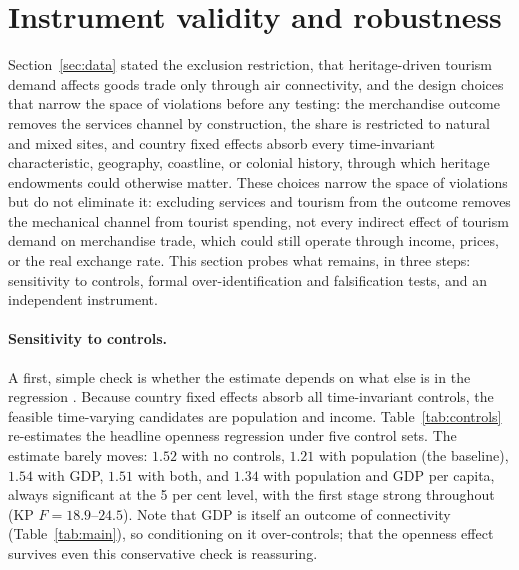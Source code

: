 \section{Instrument validity and robustness}
\label{sec:robust}
Section~\ref{sec:data} stated the exclusion restriction, that heritage-driven
tourism demand affects goods trade only through air connectivity, and the
design choices that narrow the space of violations before any testing: the
merchandise outcome removes the services channel by construction, the share
is restricted to natural and mixed sites, and country fixed effects absorb
every time-invariant characteristic, geography, coastline, or colonial
history, through which heritage endowments could otherwise matter. These
choices narrow the space of violations but do not eliminate it: excluding
services and tourism from the outcome removes the mechanical channel from
tourist spending, not every indirect effect of tourism demand on merchandise
trade, which could still operate through income, prices, or the real
exchange rate. This
section probes what remains, in three steps: sensitivity to controls, formal
over-identification and falsification tests, and an independent instrument.

\paragraph{Sensitivity to controls.} A first, simple check is whether the
estimate depends on what else is in the regression \citep[cf.][]{Frankel_1999}.
Because country fixed effects absorb all time-invariant controls, the feasible
time-varying candidates are population and income. Table~\ref{tab:controls}
re-estimates the headline openness regression under five control sets. The
estimate barely moves: $1.52$ with no controls, $1.21$ with population (the baseline), $1.54$ with GDP, $1.51$ with both, and $1.34$ with population and GDP per capita, always significant at the 5 per cent level, with the first stage strong throughout (KP $F=18.9$--$24.5$). Note that GDP is itself an
outcome of connectivity (Table~\ref{tab:main}), so conditioning on it
over-controls; that the openness effect survives even this conservative check
is reassuring.

